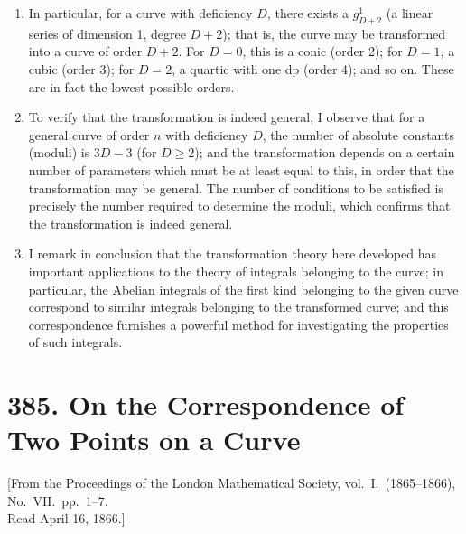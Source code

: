 \documentclass[12pt,a4paper]{article}
\theoremstyle{plain}
\theoremstyle{definition}
\theoremstyle{remark}
\begin{document}
\begin{enumerate}[label=\arabic*.]
\item In particular, for a curve with deficiency $D$, there exists a $g^1_{D+2}$ (a linear series of dimension 1, degree $D+2$); that is, the curve may be transformed into a curve of order $D+2$. For $D = 0$, this is a conic (order 2); for $D = 1$, a cubic (order 3); for $D = 2$, a quartic with one dp (order 4); and so on. These are in fact the lowest possible orders.

\item To verify that the transformation is indeed general, I observe that for a general curve of order $n$ with deficiency $D$, the number of absolute constants (moduli) is $3D - 3$ (for $D \geq 2$); and the transformation depends on a certain number of parameters which must be at least equal to this, in order that the transformation may be general. The number of conditions to be satisfied is precisely the number required to determine the moduli, which confirms that the transformation is indeed general.

\item I remark in conclusion that the transformation theory here developed has important applications to the theory of integrals belonging to the curve; in particular, the Abelian integrals of the first kind belonging to the given curve correspond to similar integrals belonging to the transformed curve; and this correspondence furnishes a powerful method for investigating the properties of such integrals.
\end{enumerate}



\section*{385. On the Correspondence of Two Points on a Curve}

\begin{center}
\small [From the Proceedings of the London Mathematical Society, vol.~I.\ (1865--1866), No.~VII.\ pp.~1--7.\\
Read April 16, 1866.]
\end{center}
\end{document}

